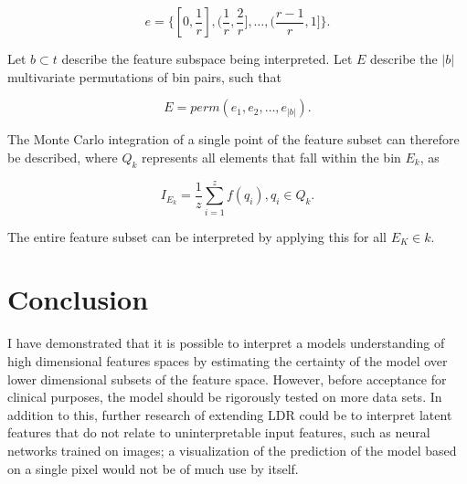 \documentclass[a4paper, twocolumn]{article}
\begin{document}
$$e = \{[0, \frac{1}{r}], (\frac{1}{r}, \frac{2}{r}], \ldots, (\frac{r-1}{r}, 1]\}.$$

Let $b \subset t$ describe the feature subspace being interpreted. Let $E$ describe the $|b|$ multivariate permutations of bin pairs, such that

$$E = perm(e_1, e_2, \ldots, e_|b|).$$

The Monte Carlo integration of a single point of the feature subset can therefore be described, where $Q_k$ represents all elements that fall within the bin $E_k$, as

$$I_{E_k} = \frac{1}{z} \sum^z_{i=1} f(q_i), q_i \in Q_k.$$

The entire feature subset can be interpreted by applying this for all $E_K \in k$.

\section{Conclusion}\label{Conclusion}

I have demonstrated that it is possible to interpret a models understanding of high dimensional features spaces by estimating the certainty of the model over lower dimensional subsets of the feature space. However, before acceptance for clinical purposes, the model should be rigorously tested on more data sets. In addition to this, further research of extending LDR could be to interpret latent features that do not relate to uninterpretable input features, such as neural networks trained on images; a visualization of the prediction of the model based on a single pixel would not be of much use by itself.

\printbibliography
\end{document}
